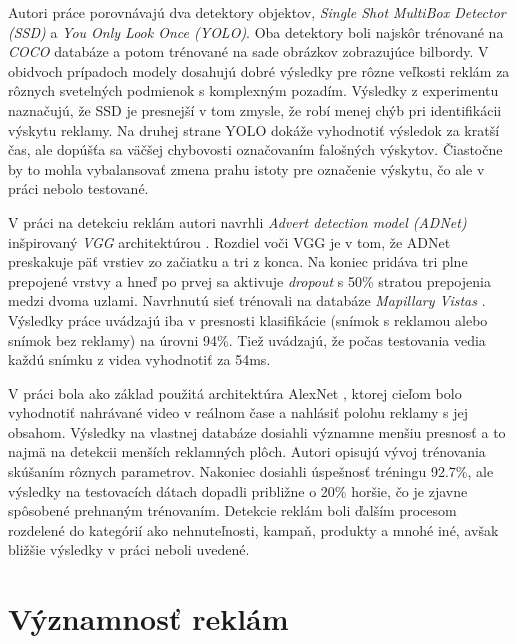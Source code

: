 
Autori práce \cite{SSD-YOLO} porovnávajú dva detektory objektov, \textit{Single Shot MultiBox Detector (SSD)} a \textit{You Only Look Once (YOLO)}. Oba detektory boli najskôr trénované na \textit{COCO} databáze \cite{Coco} a potom trénované na sade obrázkov zobrazujúce bilbordy. V obidvoch prípadoch modely dosahujú dobré výsledky pre rôzne veľkosti reklám za rôznych svetelných podmienok s komplexným pozadím. Výsledky z experimentu naznačujú, že SSD je presnejší v tom zmysle, že robí menej chýb pri identifikácii výskytu reklamy. Na druhej strane YOLO dokáže vyhodnotiť výsledok za kratší čas, ale dopúšťa sa väčšej chybovosti označovaním falošných výskytov. Čiastočne by to mohla vybalansovať zmena prahu istoty pre označenie výskytu, čo ale v práci nebolo testované.

V práci \cite{Hossari} na detekciu reklám autori navrhli \textit{Advert detection model (ADNet)} inšpirovaný \textit{VGG} architektúrou \cite{simonyan2015deep}. Rozdiel voči VGG je v tom, že ADNet preskakuje päť vrstiev zo začiatku a tri z konca. Na koniec pridáva tri plne prepojené vrstvy a hneď po prvej sa aktivuje \textit{dropout} s 50\% stratou prepojenia medzi dvoma uzlami. Navrhnutú sieť trénovali na databáze \textit{Mapillary Vistas} \cite{Mapillary}. Výsledky práce uvádzajú iba v presnosti klasifikácie (snímok s reklamou alebo snímok bez reklamy) na úrovni 94\%. Tiež uvádzajú, že počas testovania vedia každú snímku z videa vyhodnotiť za 54ms.

V práci \cite{GeoTag} bola ako základ použitá architektúra AlexNet \cite{AlexNet}, ktorej cieľom bolo vyhodnotiť nahrávané video v reálnom čase a nahlásiť polohu reklamy s jej obsahom. Výsledky na vlastnej databáze dosiahli významne menšiu presnosť a to najmä na detekcii menších reklamných plôch. Autori opisujú vývoj trénovania skúšaním rôznych parametrov. Nakoniec dosiahli úspešnosť tréningu 92.7\%, ale výsledky na testovacích dátach dopadli približne o 20\% horšie, čo je zjavne spôsobené prehnaným trénovaním. Detekcie reklám boli ďalším procesom rozdelené do kategórií ako nehnuteľnosti, kampaň, produkty a mnohé iné, avšak bližšie výsledky v práci neboli uvedené. 


\section{Významnosť reklám}

